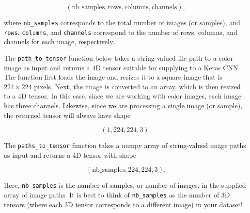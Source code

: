 \documentclass[11pt]{article}
\begin{document}
\[
(\text{nb_samples}, \text{rows}, \text{columns}, \text{channels}),
\]

where \texttt{nb\_samples} corresponds to the total number of images (or
samples), and \texttt{rows}, \texttt{columns}, and \texttt{channels}
correspond to the number of rows, columns, and channels for each image,
respectively.

The \texttt{path\_to\_tensor} function below takes a string-valued file
path to a color image as input and returns a 4D tensor suitable for
supplying to a Keras CNN. The function first loads the image and resizes
it to a square image that is \(224 \times 224\) pixels. Next, the image
is converted to an array, which is then resized to a 4D tensor. In this
case, since we are working with color images, each image has three
channels. Likewise, since we are processing a single image (or sample),
the returned tensor will always have shape

\[
(1, 224, 224, 3).
\]

The \texttt{paths\_to\_tensor} function takes a numpy array of
string-valued image paths as input and returns a 4D tensor with shape

\[
(\text{nb_samples}, 224, 224, 3).
\]

Here, \texttt{nb\_samples} is the number of samples, or number of
images, in the supplied array of image paths. It is best to think of
\texttt{nb\_samples} as the number of 3D tensors (where each 3D tensor
corresponds to a different image) in your dataset!
\end{document}

